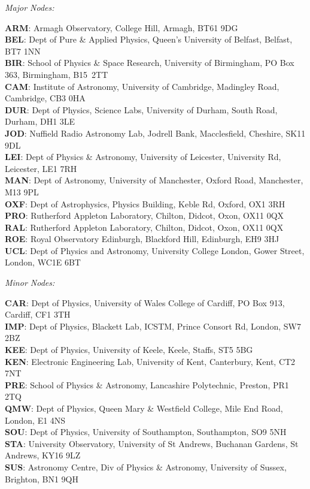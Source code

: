 {\em Major Nodes:}

{\bf ARM}: Armagh Observatory, College Hill, Armagh, BT61 9DG\\
{\bf BEL}: Dept of Pure \& Applied Physics, Queen's University of Belfast,
             Belfast, BT7 1NN\\
{\bf BIR}: School of Physics \& Space Research, University of Birmingham,
             PO Box 363, Birmingham, B15~2TT\\
{\bf CAM}: Institute of Astronomy, University of Cambridge, Madingley Road,
             Cambridge, CB3 0HA\\
{\bf DUR}: Dept of Physics, Science Labs, University of Durham, South Road,
             Durham, DH1 3LE\\
{\bf JOD}: Nuffield Radio Astronomy Lab, Jodrell Bank, Macclesfield, Cheshire,
             SK11 9DL\\
{\bf LEI}: Dept of Physics \& Astronomy, University of Leicester,
             University Rd, Leicester, LE1 7RH\\
{\bf MAN}: Dept of Astronomy, University of Manchester, Oxford Road,
             Manchester, M13 9PL\\
{\bf OXF}: Dept of Astrophysics, Physics Building, Keble Rd, Oxford, OX1 3RH\\
{\bf PRO}: Rutherford Appleton Laboratory, Chilton, Didcot, Oxon, OX11 0QX\\
{\bf RAL}: Rutherford Appleton Laboratory, Chilton, Didcot, Oxon, OX11 0QX\\
{\bf ROE}: Royal Observatory Edinburgh, Blackford Hill, Edinburgh, EH9 3HJ\\
{\bf UCL}: Dept of Physics and Astronomy, University College London,
             Gower Street, London, WC1E 6BT

{\em Minor Nodes:}

{\bf CAR}: Dept of Physics, University of Wales College of Cardiff, PO Box 913,
             Cardiff, CF1 3TH\\
{\bf IMP}: Dept of Physics, Blackett Lab, ICSTM, Prince Consort Rd, London,
             SW7 2BZ\\
{\bf KEE}: Dept of Physics, University of Keele, Keele, Staffs, ST5 5BG\\
{\bf KEN}: Electronic Engineering Lab, University of Kent, Canterbury, Kent,
             CT2 7NT\\
{\bf PRE}: School of Physics \& Astronomy, Lancashire Polytechnic, Preston,
             PR1 2TQ\\
{\bf QMW}: Dept of Physics, Queen Mary \& Westfield College, Mile End Road,
             London, E1 4NS\\
{\bf SOU}: Dept of Physics, University of Southampton, Southampton, SO9 5NH\\
{\bf STA}: University Observatory, University of St Andrews, Buchanan Gardens,
             St Andrews, KY16 9LZ\\
{\bf SUS}: Astronomy Centre, Div of Physics \& Astronomy, University of Sussex,
             Brighton, BN1 9QH

